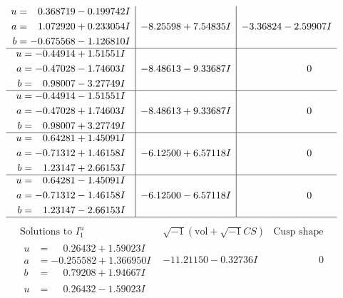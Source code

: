 \documentclass[1p]{elsarticle_modified}
\theoremstyle{definition}
\newcommand{\I}{\sqrt{-1}}
\begin{document}
$$\begin{array}{c|c|c}
\begin{aligned}
u &= \phantom{-}0.368719 - 0.199742 I \\
a &= \phantom{-}1.072920 + 0.233054 I \\
b &= -0.675568 - 1.126810 I\end{aligned}
 & -8.25598 + 7.54835 I & -3.36824 - 2.59907 I \\ \hline\begin{aligned}
u &= -0.44914 + 1.51551 I \\
a &= -0.47028 - 1.74603 I \\
b &= \phantom{-}0.98007 - 3.27749 I\end{aligned}
 & -8.48613 - 9.33687 I & \phantom{-0.000000 } 0 \\ \hline\begin{aligned}
u &= -0.44914 - 1.51551 I \\
a &= -0.47028 + 1.74603 I \\
b &= \phantom{-}0.98007 + 3.27749 I\end{aligned}
 & -8.48613 + 9.33687 I & \phantom{-0.000000 } 0 \\ \hline\begin{aligned}
u &= \phantom{-}0.64281 + 1.45091 I \\
a &= -0.71312 + 1.46158 I \\
b &= \phantom{-}1.23147 + 2.66153 I\end{aligned}
 & -6.12500 + 6.57118 I & \phantom{-0.000000 } 0 \\ \hline\begin{aligned}
u &= \phantom{-}0.64281 - 1.45091 I \\
a &= -0.71312 - 1.46158 I \\
b &= \phantom{-}1.23147 - 2.66153 I\end{aligned}
 & -6.12500 - 6.57118 I & \phantom{-0.000000 } 0\\
 \hline 
 \end{array}$$\newpage$$\begin{array}{c|c|c}  
\text{Solutions to }I^u_{1}& \I (\text{vol} + \sqrt{-1}CS) & \text{Cusp shape}\\
 \hline 
\begin{aligned}
u &= \phantom{-}0.26432 + 1.59023 I \\
a &= -0.255582 + 1.366950 I \\
b &= \phantom{-}0.79208 + 1.94667 I\end{aligned}
 & -11.21150 - 0.32736 I & \phantom{-0.000000 } 0 \\ \hline\begin{aligned}
u &= \phantom{-}0.26432 - 1.59023 I \\

\end{aligned}
\end{array}$$
\end{document}
